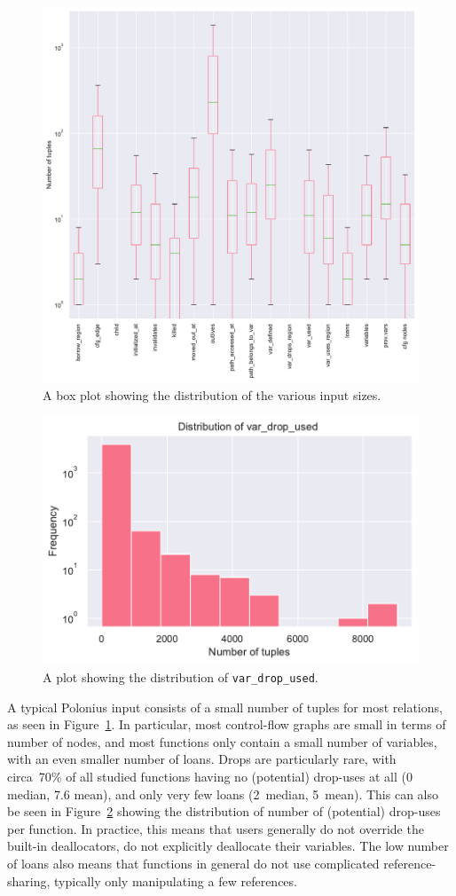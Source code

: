 \documentclass[11pt,a4paper,twoside,openany,draft]{report}
\newcommand{\InDatalog}[1]{\texttt{#1}}
\begin{document}
\begin{figure}
  \includegraphics[width=0.9\linewidth]{Graphs/input_sizes_boxplot.pdf}
  \caption[Distribution of Polonius Input Tuple Sizes]{A box plot showing the
    distribution of the various input sizes.}
  \label{fig:input-sizes}
\end{figure}

\begin{figure}
  \includegraphics[width=0.5\linewidth]{Graphs/var_drop_used_size_dist.pdf}
  \caption[Distribution of Input Sizes for the \InDatalog{var_drop_used} Fact]{A
    plot showing the distribution of \InDatalog{var_drop_used}.}
  \label{fig:input-var-drop-used}
\end{figure}

A typical Polonius input consists of a small number of tuples for most
relations, as seen in Figure~\ref{fig:input-sizes}. In particular, most
control-flow graphs are small in terms of number of nodes, and most functions
only contain a small number of variables, with an even smaller number of loans.
Drops are particularly rare, with circa~70\% of all studied functions having
no (potential) drop-uses at all (0 median, 7.6 mean), and only very few
loans (2~median, 5~mean). This can also be seen in
Figure~\ref{fig:input-var-drop-used} showing the distribution of number of
(potential) drop-uses per function. In practice, this means that users generally
do not override the built-in deallocators, do not explicitly deallocate their
variables. The low number of loans also means that functions in general do not
use complicated reference-sharing, typically only manipulating a few references.
\end{document}
